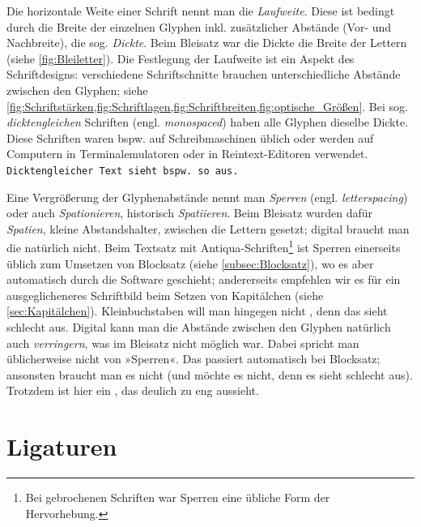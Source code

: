 Die horizontale Weite einer Schrift nennt man die \emph{Laufweite}.
Diese ist bedingt durch die Breite der einzelnen Glyphen
inkl. zusätzlicher Abstände (Vor- und Nachbreite), die
sog. \emph{Dickte}.  Beim Bleisatz war die Dickte die Breite der
Lettern (siehe \cref{fig:Bleiletter}).  Die Festlegung der Laufweite
ist ein Aspekt des Schriftdesigns: verschiedene Schriftschnitte
brauchen unterschiedliche Abstände zwischen den Glyphen; siehe
\cref{fig:Schriftstärken,fig:Schriftlagen,fig:Schriftbreiten,fig:optische_Größen}.
Bei sog. \emph{dicktengleichen} Schriften
(engl. \emph{\foreignlanguage{british}{monospaced}}) haben alle
Glyphen dieselbe Dickte.  Diese Schriften waren bspw. auf
Schreibmaschinen üblich oder werden auf Computern in
Terminalemulatoren oder in Reintext-Editoren verwendet.
\texttt{Dicktengleicher Text sieht bspw. so aus.}

Eine Vergrößerung der Glyphenabstände nennt man \emph{Sperren}
(engl. \emph{\foreignlanguage{british}{letterspacing}}) oder auch
\emph{Spationieren}, historisch \emph{Spatiieren}.  Beim Bleisatz
wurden dafür \emph{Spatien}, kleine Abstandshalter, zwischen die
Lettern gesetzt; digital braucht man die natürlich nicht.  Beim
Textsatz mit Antiqua-Schriften\footnote{Bei gebrochenen Schriften war
  Sperren eine übliche Form der Hervorhebung.} ist Sperren einerseits
üblich zum Umsetzen von Blocksatz (siehe \cref{subsec:Blocksatz}), wo
es aber automatisch durch die Software geschieht; andererseits
empfehlen wir es für ein ausgeglicheneres Schriftbild beim Setzen von
Kapitälchen (siehe \cref{sec:Kapitälchen}).  Kleinbuchstaben will man
hingegen nicht , denn das sieht schlecht aus.
Digital kann man die Abstände zwischen den Glyphen natürlich auch
\emph{verringern}, was im Bleisatz nicht möglich war.  Dabei spricht
man üblicherweise nicht von »Sperren«.  Das passiert automatisch bei
Blocksatz; ansonsten braucht man es nicht (und möchte es nicht, denn
es sieht schlecht aus).  Trotzdem ist hier ein ,
das deulich zu eng aussieht.


\section{Ligaturen}


